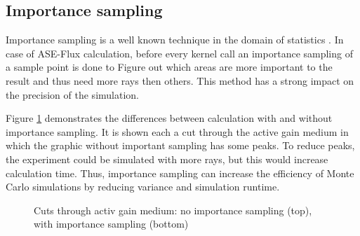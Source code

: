 \subsection{Importance sampling}
\label{subsec:importance_sampling}
Importance sampling is a well known technique in the domain
of statistics \cite{importanceSamplingSource}. In case of 
ASE-Flux calculation, before every kernel call an importance sampling 
of a sample point is done to Figure out which areas are more
important to the result and thus need more rays then others.
This method has a strong impact on the precision of the simulation.

Figure \ref{graphic:importance} demonstrates
the differences between calculation with and without
importance sampling. It is shown each a cut through the active
gain medium in which the graphic without important
sampling has some peaks. To reduce peaks, the experiment
could be simulated with more rays, but this would increase
calculation time. Thus, importance sampling can increase the
efficiency of Monte Carlo simulations by reducing variance 
and simulation runtime. 
\begin{figure}[H]
  \centerline
  {}
  \caption{Cuts through activ gain medium: no importance sampling (top), with importance sampling (bottom)}
  \label{graphic:importance}
\end{figure}

